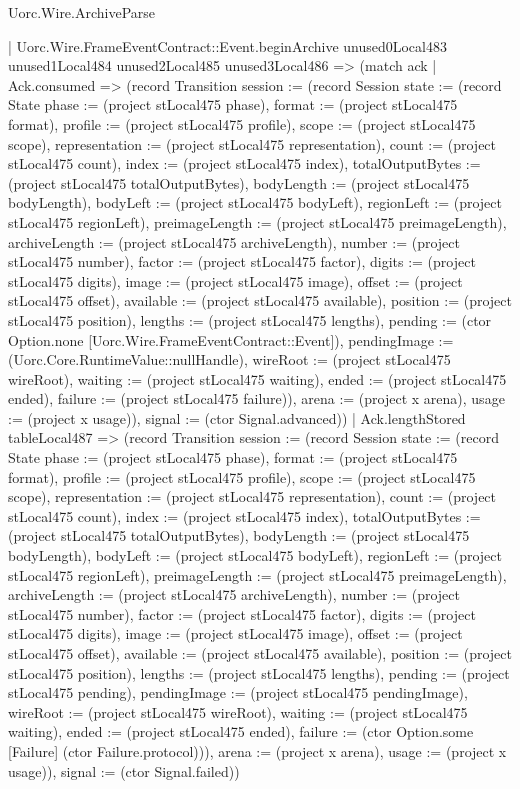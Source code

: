 \begin{lexlean}{Uorc.Wire.ArchiveParse}
\begin{semanticmodule}
{        | Uorc.Wire.FrameEventContract::Event.beginArchive unused0Local483 unused1Local484 unused2Local485 unused3Local486 => (match ack
          | Ack.consumed => (record Transition {session := (record Session {state := (record State {phase := (project stLocal475 phase), format := (project stLocal475 format), profile := (project stLocal475 profile), scope := (project stLocal475 scope), representation := (project stLocal475 representation), count := (project stLocal475 count), index := (project stLocal475 index), totalOutputBytes := (project stLocal475 totalOutputBytes), bodyLength := (project stLocal475 bodyLength), bodyLeft := (project stLocal475 bodyLeft), regionLeft := (project stLocal475 regionLeft), preimageLength := (project stLocal475 preimageLength), archiveLength := (project stLocal475 archiveLength), number := (project stLocal475 number), factor := (project stLocal475 factor), digits := (project stLocal475 digits), image := (project stLocal475 image), offset := (project stLocal475 offset), available := (project stLocal475 available), position := (project stLocal475 position), lengths := (project stLocal475 lengths), pending := (ctor Option.none [Uorc.Wire.FrameEventContract::Event]), pendingImage := (Uorc.Core.RuntimeValue::nullHandle), wireRoot := (project stLocal475 wireRoot), waiting := (project stLocal475 waiting), ended := (project stLocal475 ended), failure := (project stLocal475 failure)}), arena := (project x arena), usage := (project x usage)}), signal := (ctor Signal.advanced)})
          | Ack.lengthStored tableLocal487 => (record Transition {session := (record Session {state := (record State {phase := (project stLocal475 phase), format := (project stLocal475 format), profile := (project stLocal475 profile), scope := (project stLocal475 scope), representation := (project stLocal475 representation), count := (project stLocal475 count), index := (project stLocal475 index), totalOutputBytes := (project stLocal475 totalOutputBytes), bodyLength := (project stLocal475 bodyLength), bodyLeft := (project stLocal475 bodyLeft), regionLeft := (project stLocal475 regionLeft), preimageLength := (project stLocal475 preimageLength), archiveLength := (project stLocal475 archiveLength), number := (project stLocal475 number), factor := (project stLocal475 factor), digits := (project stLocal475 digits), image := (project stLocal475 image), offset := (project stLocal475 offset), available := (project stLocal475 available), position := (project stLocal475 position), lengths := (project stLocal475 lengths), pending := (project stLocal475 pending), pendingImage := (project stLocal475 pendingImage), wireRoot := (project stLocal475 wireRoot), waiting := (project stLocal475 waiting), ended := (project stLocal475 ended), failure := (ctor Option.some [Failure] (ctor Failure.protocol))}), arena := (project x arena), usage := (project x usage)}), signal := (ctor Signal.failed)})
}
\end{semanticmodule}
\end{lexlean}
